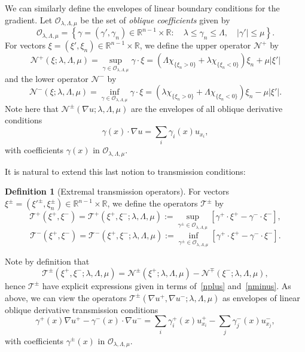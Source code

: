 \documentclass[letter,11pt]{amsart}
\newcommand{\R}{\mathbb{R}}
\newcommand{\chara}[1]{\chi_{#1}}
\newcommand{\ellvec}{\mathcal{O}_{\lambda,\Lambda,\mu}}
\newcommand{\ncal}{\mathcal{N}}
\newcommand{\tcal}{\mathcal{T}}
\theoremstyle{definition}
\newtheorem{defn}[thm]{Definition}
\numberwithin{equation}{section}
\begin{document}
\medskip
 
We can similarly define the envelopes of linear boundary conditions for the gradient.
Let $\ellvec$ be the set of \emph{oblique coefficients} given by
\[
\ellvec = 
\left\{
\gamma = (\gamma', \gamma_n) \in \R^{n-1} \times \R \colon \quad \lambda \leq \gamma_n \leq \Lambda, \quad |\gamma'| \leq \mu
\right\}.
\]
For vectors $\xi = (\xi', \xi_n) \in \R^{n-1}\times \R$, we define the upper operator $\ncal^{+}$ by
\begin{equation}
\label{nplus}
\ncal^{+}(\xi; \lambda,\Lambda,\mu)
 = \sup_{\gamma \in \ellvec} \gamma \cdot \xi
= \left( \Lambda \chara{\{\xi_n > 0\}} + \lambda \chara{\{\xi_n < 0\}} \right) \xi_n + \mu |\xi'|
\end{equation}
and the lower operator $\ncal^{-}$ by
\begin{equation}
\label{nminus}
\ncal^{-}(\xi; \lambda,\Lambda,\mu)
= \inf_{\gamma \in \ellvec} \gamma \cdot \xi
= \left( \lambda \chara{\{\xi_n > 0\}} + \Lambda \chara{\{\xi_n < 0\}} \right) \xi_n - \mu |\xi'|.
\end{equation}
Note here that $\ncal^{\pm}(\nabla u; \lambda, \Lambda, \mu)$ are the envelopes of all oblique derivative conditions 
\[
\gamma(x) \cdot \nabla u = \sum_{i}\gamma_i (x) u_{x_i},
\]
with coefficients $\gamma(x)$ in $\ellvec$.

\medskip

It is natural to extend this last notion to transmission conditions:

\begin{defn}[Extremal transmission operators]
For vectors 
$\xi^{\pm} = (\xi'^{\pm}, \xi_n^{\pm}) \in \R^{n-1}\times \R$, 
we define the operators $\tcal^{\pm}$ by
\[
\tcal^{+}(\xi^{+}, \xi^{-}) 
= \tcal^{+}(\xi^{+}, \xi^{-}; \lambda,\Lambda,\mu)
:= \sup_{\gamma^{\pm} \in \ellvec} \left[\gamma^{+} \cdot \xi^{+} - \gamma^{-} \cdot \xi^{-}\right],
\]
\[
\tcal^{-}(\xi^{+}, \xi^{-})  
= \tcal^{-}(\xi^{+}, \xi^{-}; \lambda,\Lambda,\mu)
:= \inf_{\gamma^{\pm} \in \ellvec} \left[\gamma^{+} \cdot \xi^{+} - \gamma^{-} \cdot \xi^{-}\right].
\]
\end{defn}

Note by definition that
\[
\tcal^{\pm}(\xi^{+}, \xi^{-}; \lambda,\Lambda,\mu) = \ncal^{\pm}(\xi^{+}; \lambda, \Lambda, \mu) - \ncal^{\mp}(\xi^{-}; \lambda, \Lambda, \mu),
\]
hence $\tcal^{\pm}$ have explicit expressions given in terms of~\eqref{nplus} and~\eqref{nminus}.
As above, we can view the operators $\tcal^{\pm}(\nabla u^{+}, \nabla u^{-}; \lambda, \Lambda, \mu)$ as envelopes of linear oblique derivative transmission conditions 
\[
\gamma^{+}(x) \nabla u^{+} - \gamma^{-}(x) \cdot \nabla u^{-}
= \sum_{i} \gamma_i^{+}(x) u_{x_i}^{+} 
- \sum_{j} \gamma_j^{-}(x) u_{x_j}^{-},
\]
with coefficients $\gamma^{\pm}(x)$ in $\ellvec$.
\end{document}
